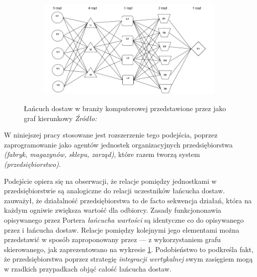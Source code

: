 \documentclass[polish, twoside, 12pt, a4paper]{article}
\theoremstyle{definition}
\theoremstyle{plain}
\theoremstyle{remark}
\begin{document}
\begin{figure}[hbt]
  \centering
  \begin{subfigure}[t]{0.8\textwidth}
    \includegraphics[width=\textwidth]{pictures/siec.png}
  \end{subfigure}
  \captionsetup{margin=10pt,font=small,labelfont=bf,width=.8\textwidth}
  \caption[Łańcuch dostaw w postaci grafu kierunkowego]{Łańcuch dostaw w branży komputerowej przedstawione przez \cite{Kawa2010} jako graf kierunkowy \textit{Źródło:} \cite{Kawa2010}}\label{fig:siecKawa}
\end{figure}


W niniejszej pracy stosowane jest rozszerzenie tego podejścia, poprzez zaprogramowanie jako agentów jednostek organizacyjnych przedsiębiorstwa \textit{(fabryk, magazynów, sklepu, zarząd)}, które razem tworzą system \textit{(przedsiębiorstwo)}. 

Podejście opiera się na obserwacji, że relacje pomiędzy jednostkami w przedsiębiorstwie są analogiczne do relacji uczestników łańcucha dostaw. \cite{Porter1985} zauważył, że działalność przedsiębiorstwa to de facto sekwencja działań, która na każdym ogniwie zwiększa wartość dla odbiorcy. Zasady funkcjononawia opisywanego przez Portera \textit{łańcucha wartości} są identyczne co do opisywanego przez \cite{Moyaux2006} i \cite{Kawa2010} łańcucha dostaw. Relacje pomiędzy kolejnymi jego elementami można przedstawić w sposób zaproponowany przez \cite{Kawa2010} --- z wykorzystaniem grafu skierowanego, jak zaprezentowano na wykresie \ref{fig:siecKawa}. Podobieństwo to podkreśla fakt, że przedsiębiorstwa poprzez strategię \textit{integracji wertykalnej} swym zasięgiem mogą w rzadkich przypadkach objąć całość łańcucha dostaw.  
\end{document}
